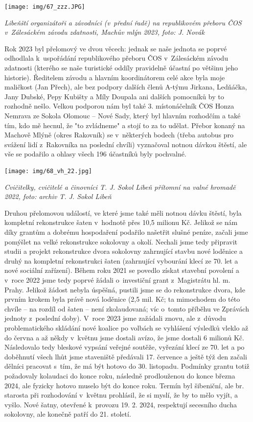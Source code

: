 \documentclass[a5paper, 11pt, twoside]{article}
\begin{document}
 \texttt{[image: img/67\_zzz.JPG]}

\textit{Libeňští organizátoři a závodníci (v~přední řadě) na republikovém
přeboru ČOS v~Zálesáckém závodu zdatnosti, Machův mlýn 2023, foto: J.
Novák}

Rok 2023 byl přelomový ve dvou věcech: jednak se naše jednota se poprvé
odhodlala k~uspořádání republikového přeboru ČOS v~Zálesáckém závodu
zdatnosti (kterého se naše turistické oddíly pravidelně účastní po
většinu jeho historie). Ředitelem závodu a hlavním koordinátorem celé
akce byla moje maličkost (Jan Přech), ale bez podpory dalších členů
A-týmu Jirkana, Ledňáčka, Jany Dubské, Pepy Kubišty a Míly Doupala ani
dalších pomocníků by to rozhodně nešlo. Velkou podporou nám byl také 3.
místonáčelník ČOS Honza Nemrava ze Sokola Olomouc -- Nové Sady, který
byl hlavním rozhodčím a také tím, kdo mě hecnul, že "to zvládneme" a
stojí to za to udělat. Přebor konaný na Machově Mlýně (okres Rakovník)
se v~některých bodech (třeba autobus pro svážení lidí z~Rakovníka na
poslední chvíli) vyznačoval notnou dávkou štěstí, ale vše se podařilo a
ohlasy všech 196 účastníků byly pochvalné.

 \texttt{[image: img/68\_vh\_22.jpg]}

\textit{Cvičitelky, cvičitelé a činovníci T. J. Sokol Libeň přítomní na
valné hromadě 2022, foto: archiv T. J. Sokol Libeň}

Druhou přelomovou událostí, ve které jsme také měli notnou dávku štěstí,
byla kompletní rekonstrukce šaten v~hodnotě přes 10,5 milionu Kč.
Jelikož se nám díky grantům a dobrému hospodaření podařilo našetřit
slušné peníze, začali jsme pomýšlet na velké rekonstrukce sokolovny a
okolí. Nechali jsme tedy připravit studii a projekt rekonstrukce dvora
sokolovny zahrnující stavbu nové loděnice a druhý na kompletní
rekonstrukci šaten (zahrnující vybourání klecí ze 70. let a nové
sociální zařízení). Během roku 2021 se povedlo získat stavební povolení
a v~roce 2022 jsme tedy poprvé žádali o~investiční grant z~Magistrátu
hl. m. Prahy. Jelikož žádost nebyla úspěšná, pustili jsme se do
rekonstrukce dvora, kde prvním krokem byla právě nová loděnice (2,5 mil.
Kč; ta mimochodem do této chvíle -- na rozdíl od šaten -- není
zkolaudovaná; víc o~tomto příběhu ve Zprávách jednoty z~poslední doby).
V~roce 2023 jsme zažádali znovu, ale z~důvodu problematického skládání
nové koalice po volbách se vyhlášení výsledků vleklo až do června a až
někdy v~květnu jsme dostali avízo, že jsme dostali 6 milionů Kč.
Následovalo tedy bleskové vypsání veřejné soutěže, vyřezání klecí ze 70.
let a po doběhnutí všech lhůt jsme staveniště předávali 17. července a
ještě týž den začali dělníci pracovat s~tím, že má být hotovo do 30.
listopadu. Podmínky grantu totiž požadovaly kolaudaci do konce roku,
následně prodlouženou do konce března 2024, ale fyzicky hotovo muselo
být do konce roku. Termín byl šibeniční, ale br. starosta při
rozhodování v~květnu prohlásil, že si myslí, že by to mělo vyjít, a
vyšlo. Nové šatny, otevřené k~provozu 19. 2. 2024, respektují secesního
ducha sokolovny, ale konečně patří do 21. století.
\end{document}
